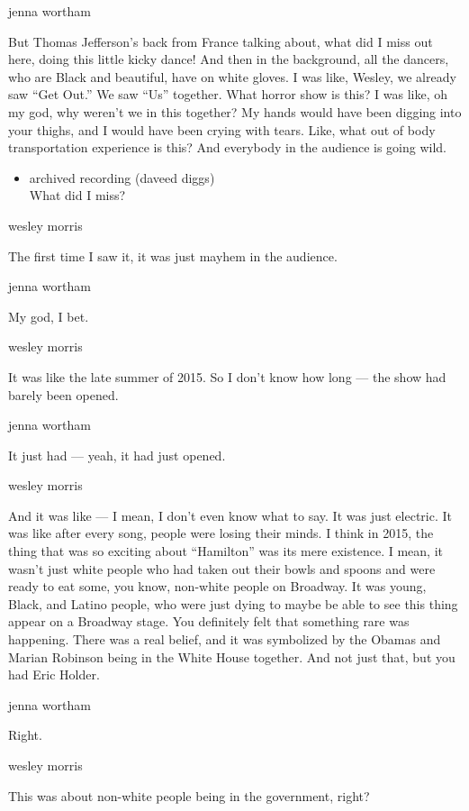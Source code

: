 jenna wortham

But Thomas Jefferson's back from France talking about, what did I miss
out here, doing this little kicky dance! And then in the background, all
the dancers, who are Black and beautiful, have on white gloves. I was
like, Wesley, we already saw ``Get Out.'' We saw ``Us'' together. What
horror show is this? I was like, oh my god, why weren't we in this
together? My hands would have been digging into your thighs, and I would
have been crying with tears. Like, what out of body transportation
experience is this? And everybody in the audience is going wild.

\begin{itemize}
\tightlist
\item
  archived recording (daveed diggs)\\
  What did I miss?
\end{itemize}

wesley morris

The first time I saw it, it was just mayhem in the audience.

jenna wortham

My god, I bet.

wesley morris

It was like the late summer of 2015. So I don't know how long --- the
show had barely been opened.

jenna wortham

It just had --- yeah, it had just opened.

wesley morris

And it was like --- I mean, I don't even know what to say. It was just
electric. It was like after every song, people were losing their minds.
I think in 2015, the thing that was so exciting about ``Hamilton'' was
its mere existence. I mean, it wasn't just white people who had taken
out their bowls and spoons and were ready to eat some, you know,
non-white people on Broadway. It was young, Black, and Latino people,
who were just dying to maybe be able to see this thing appear on a
Broadway stage. You definitely felt that something rare was happening.
There was a real belief, and it was symbolized by the Obamas and Marian
Robinson being in the White House together. And not just that, but you
had Eric Holder.

jenna wortham

Right.

wesley morris

This was about non-white people being in the government, right?

